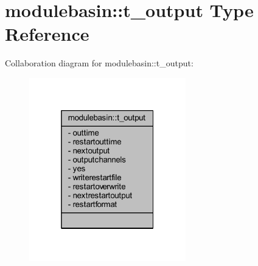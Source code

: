 \hypertarget{structmodulebasin_1_1t__output}{}\section{modulebasin\+:\+:t\+\_\+output Type Reference}
\label{structmodulebasin_1_1t__output}


Collaboration diagram for modulebasin\+:\+:t\+\_\+output\+:\nopagebreak
\begin{figure}[H]
\begin{center}
\leavevmode
\includegraphics[width=193pt]{structmodulebasin_1_1t__output__coll__graph}
\end{center}
\end{figure}
